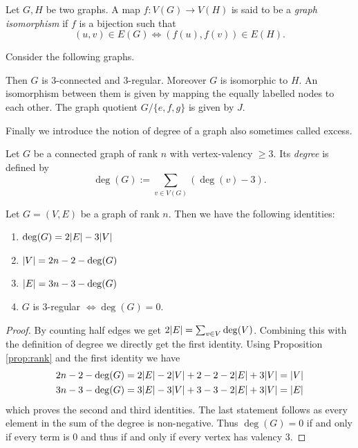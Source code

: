 \begin{definition}
	Let $G,H$ be two graphs. A map $f: V(G) \to V(H)$ is said to be a \emph{graph isomorphism} if $f$ is a bijection such that
	\[
		(u,v) \in E(G) \Leftrightarrow (f(u),f(v)) \in E(H)
	.\] 
\end{definition}

\begin{eg}\label{ex:gAuto}
	Consider the following graphs.

	Then $G$ is $3$-connected and $3$-regular. Moreover $G$ is isomorphic to $H$.
	An isomorphism between them is given by mapping the equally labelled nodes to each other.
	The graph quotient $G / \{e,f,g\}$ is given by $J$.
\end{eg}

Finally we introduce the notion of degree of a graph also sometimes called excess.
\begin{definition}
	Let $G$ be a connected graph of rank $n$ with vertex-valency $\geq 3$. Its \emph{degree} is defined by
	\[
		\deg(G) := \sum_{v \in V(G)} (\deg(v) - 3)
	.\] 
\end{definition}

\begin{proposition}
	Let $G = (V,E)$ be a graph of rank $n$. Then we have the following identities:
	\begin{enumerate}
		\item $\deg(G) = 2 \abs{E} - 3 \abs{V}$
		\item $\abs{V} = 2n -2 - \deg(G)$
		\item $\abs{E} = 3n - 3 - \deg(G)$
		\item $G$ is $3$-regular $\Leftrightarrow \deg(G) = 0$.
	\end{enumerate}	
\end{proposition}

\begin{proof}
	By counting half edges we get $2 \abs{E} = \sum_{v \in V} \deg(V)$.
	Combining this with the definition of degree we directly get the first identity.
	Using Proposition \ref{prop:rank} and the first identity we have
	\begin{align*}
		2 n -2 - \deg(G) &= 2 \abs{E} - 2 \abs{V} + 2 - 2 - 2\abs{E} + 3 \abs{V} = \abs{V}\\
		3 n -3 - \deg(G) &= 3 \abs{E} - 3 \abs{V} + 3 - 3 - 2\abs{E} + 3 \abs{V} = \abs{E}
	\end{align*}
	which proves the second and third identities. The last statement follows as every element in the sum of the degree is non-negative.
	Thus $\deg(G) = 0$ if and only if every term is $0$ and thus if and only if every vertex has valency $3$.
\end{proof}

